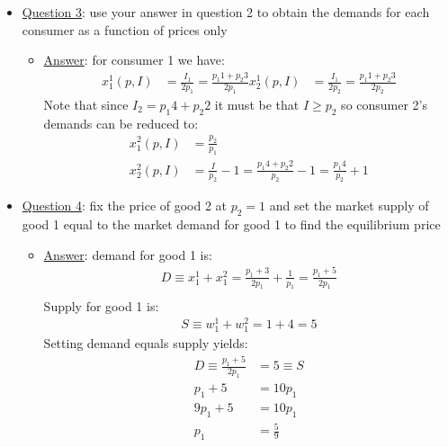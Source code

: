 \documentclass{article}
\begin{document}
  \begin{itemize}
    \item  \underline{Question 3}: use your answer in question 2 to obtain the demands for each consumer as a function of prices only
    \begin{itemize}
      \item  \underline{Answer}: for consumer 1 we have:
      \begin{align*}
        x_{1}^{1}(p,I) &= \frac{I_{1}}{2p_{1}} = \frac{p_{1}1 + p_{2}3}{2p_{1}}
        x_{2}^{1}(p,I) &= \frac{I_{1}}{2p_{2}} = \frac{p_{1}1 + p_{2}3}{2p_{2}}
      \end{align*}
      Note that since $I_{2} = p_{1}4 + p_{2}2$ it must be that $I \geq p_{2}$ so consumer 2's demands can be reduced to:
      \begin{align*}
        x_{1}^{2}(p,I) &= \frac{p_{2}}{p_{1}}  \\
        x_{2}^{2}(p,I) &= \frac{I}{p_{2}} - 1 = \frac{p_{1}4 + p_{2}2}{p_{2}} - 1 = \frac{p_{1}4}{p_{2}} + 1
      \end{align*}
    \end{itemize}
  \end{itemize}
  \begin{itemize}
    \item  \underline{Question 4}: fix the price of good 2 at $p_{2} =1$ and set the market supply of good 1 equal to the market demand for good 1 to find the equilibrium price
    \begin{itemize}
      \item  \underline{Answer}: demand for good 1 is:
      \begin{gather*}
        D \equiv x_{1}^{1} + x_{1}^{2} = \frac{p_{1}+3}{2p_{1}} + \frac{1}{p_{1}} = \frac{p_{1} + 5}{2p_{1}} \\
      \end{gather*}
      Supply for good 1 is:
      \begin{gather*}
        S \equiv w_{1}^{1} + w_{1}^{2} = 1 + 4 = 5
      \end{gather*}
      Setting demand equals supply yields:
      \begin{align*}
        D \equiv \frac{p_{1} + 5}{2p_{1}} &= 5 \equiv S \\
        p_{1} + 5 &= 10p_{1} \\
        9p_{1} + 5 &= 10p_{1} \\
        p_{1} &= \frac{5}{9}
      \end{align*}
    \end{itemize}
  \end{itemize}
\end{document}
